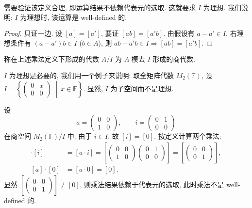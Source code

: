 需要验证该定义合理, 即运算结果不依赖代表元的选取. 这就要求 $I$ 为理想.
我们说明: $I$ 为理想时, 该运算是 well-defined 的.

\begin{proof}
只证一边. 设 $[a]=[a']$, 要证 $[ab]=[a'b]$.
由假设有 $a-a'\in I$, 右理想条件有 $(a-a')b\in I$ ($b\in A$), 则
$ab-a'b\in I\Rightarrow[ab]=[a'b]$.
\end{proof}

\begin{definition}[商代数]\label{def:quotient-algebra}
称在上述乘法定义下形成的代数 $A/I$ 为 $A$ 模去 $I$ 形成的商代数.
\end{definition}

\begin{remark}\label{rem:ideal-necessary}
$I$ 为理想是必要的, 我们用一个例子来说明:
取全矩阵代数 $M_2(\mathbb{F})$, 设
$I=\left\{\begin{pmatrix}0&x\\0&0\end{pmatrix}\ \middle|\ x\in \mathbb{F}\right\}$.
显然, $I$ 为子空间而不是理想.
\end{remark}

设
\[
  a=\begin{pmatrix}0&0\\1&0\end{pmatrix},\qquad
  i=\begin{pmatrix}0&1\\0&0\end{pmatrix}
\]
在商空间 $M_2(\mathbb{F})/I$ 中.
由于 $i\in I$, 故 $[i]=[0]$. 按定义计算两个乘法:
\begin{align*}
  [a]\cdot[i] &= [a\cdot i]
  =\left[\begin{pmatrix}0&0\\1&0\end{pmatrix}\begin{pmatrix}0&1\\0&0\end{pmatrix}\right]
  =\left[\begin{pmatrix}0&0\\0&1\end{pmatrix}\right],\\
  [a]\cdot[0] &= [a\cdot 0]=[0].
\end{align*}
显然 $\left[\begin{pmatrix}0&0\\0&1\end{pmatrix}\right]\neq[0]$, 则乘法结果依赖于代表元的选取,
此时乘法不是 well-defined 的.

